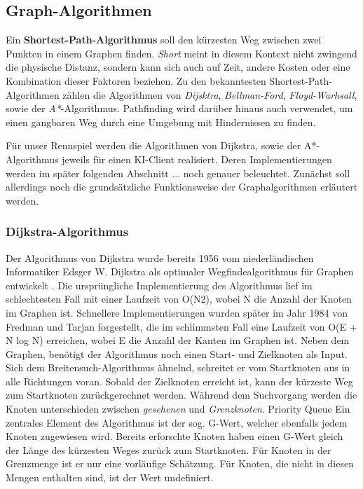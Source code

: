 \subsection{Graph-Algorithmen}
Ein \textbf{Shortest-Path-Algorithmus} soll den kürzesten Weg zwischen zwei Punkten in einem Graphen finden. \textit{Short} meint in diesem Kontext nicht zwingend die physische Distanz, sondern kann sich auch auf Zeit, andere Kosten oder eine Kombination dieser Faktoren beziehen.\newline  
Zu den bekanntesten Shortest-Path-Algorithmen zählen die Algorithmen von \textit{Dijsktra}, \textit{Bellman-Ford}, \textit{Floyd-Warhsall}, sowie der \textit{A*}-Algorithmus.\newline
Pathfinding wird darüber hinaus auch verwendet, um einen gangbaren Weg durch eine Umgebung mit Hindernissen zu finden.


Für unser Rennspiel werden die Algorithmen von Dijkstra, sowie der A*-Algorithmus jeweils für einen KI-Client realisiert. Deren Implementierungen werden im später folgenden Abschnitt ... noch genauer beleuchtet. Zunächst soll allerdings noch die grundsätzliche Funktionsweise der Graphalgorithmen erläutert werden.\newline

\subsubsection{Dijkstra-Algorithmus}
Der Algorithmus von Dijkstra wurde bereits 1956 vom niederländischen Informatiker Edsger W. Dijkstra als optimaler Wegfindealgorithmus für Graphen entwickelt \cite{}.\newline
Die ursprüngliche Implementierung des Algorithmus lief im schlechtesten Fall mit einer Laufzeit von O(N2), wobei N die Anzahl der Knoten im Graphen ist.
Schnellere Implementierungen wurden später im Jahr 1984 von Fredman und Tarjan \cite{Fredman.1984} forgestellt, die im schlimmsten Fall eine Laufzeit von O(E + N log N) erreichen, wobei E die Anzahl der Kanten im Graphen ist.
Neben dem Graphen, benötigt der Algorithmus noch einen Start- und Zielknoten als Input. Sich dem Breitensuch-Algorithmus ähnelnd, schreitet er vom Startknoten aus in alle Richtungen voran.
Sobald der Zielknoten erreicht ist, kann der kürzeste Weg zum Startknoten zurückgerechnet werden.\newline
Während dem Suchvorgang werden die Knoten unterschieden zwischen \textit{gesehenen} und \textit{Grenzknoten}.\newline
Priority Queue\newline 
Ein zentrales Element des Algorithmus ist der sog. G-Wert, welcher ebenfalls jedem Knoten zugewiesen wird.
Bereits erforschte Knoten haben einen G-Wert gleich der Länge des kürzesten Weges zurück zum Startknoten. Für Knoten in der Grenzmenge ist er nur eine vorläufige Schätzung. Für Knoten, die nicht in diesen Mengen enthalten sind, ist der Wert undefiniert.\newline


